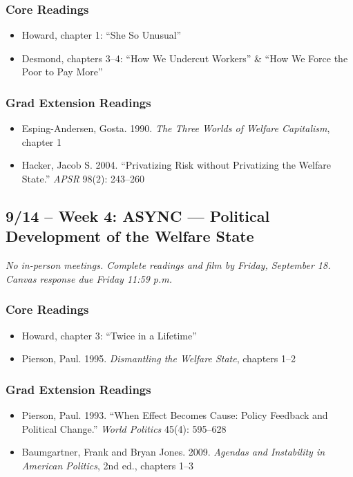 \documentclass[12pt]{article}
\begin{document}
    \subsubsection*{Core Readings}
        \begin{itemize}
            \item Howard, chapter 1: ``She So Unusual''
            \item Desmond, chapters 3--4: ``How We Undercut Workers'' \& ``How We Force the Poor to Pay More''
        \end{itemize}
    \subsubsection*{Grad Extension Readings}
        \begin{itemize}
            \item Esping-Andersen, Gosta. 1990. \emph{The Three Worlds of Welfare Capitalism}, chapter 1
            \item Hacker, Jacob S. 2004. ``Privatizing Risk without Privatizing the Welfare State.'' \emph{APSR} 98(2): 243--260
        \end{itemize}

\subsection*{9/14 -- Week 4: \textbf{ASYNC} --- Political Development of the Welfare State}
\emph{No in-person meetings. Complete readings and film by Friday, September 18. Canvas response due Friday 11:59 p.m.}
    \subsubsection*{Core Readings}
        \begin{itemize}
            \item Howard, chapter 3: ``Twice in a Lifetime''
            \item Pierson, Paul. 1995. \emph{Dismantling the Welfare State}, chapters 1--2
        \end{itemize}
    \subsubsection*{Grad Extension Readings}
        \begin{itemize}
            \item Pierson, Paul. 1993. ``When Effect Becomes Cause: Policy Feedback and Political Change.'' \emph{World Politics} 45(4): 595--628
            \item Baumgartner, Frank and Bryan Jones. 2009. \emph{Agendas and Instability in American Politics}, 2nd ed., chapters 1--3
        \end{itemize}
\end{document}
